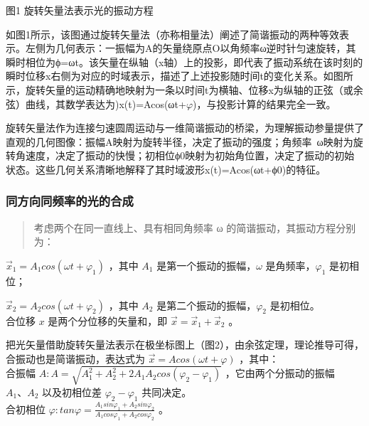 \documentclass[
]{article}
\begin{document}
图1 旋转矢量法表示光的振动方程

如图1所示，该图通过旋转矢量法（亦称相量法）阐述了简谐振动的两种等效表示。左侧为几何表示：一振幅为A的矢量绕原点O以角频率ω逆时针匀速旋转，其瞬时相位为ϕ=ωt。该矢量在纵轴（x轴）上的投影，即代表了振动系统在该时刻的瞬时位移x右侧为对应的时域表示，描述了上述投影随时间t的变化关系。如图所示，旋转矢量的运动精确地映射为一条以时间t为横轴、位移x为纵轴的正弦（或余弦）曲线，其数学表达为)x(t)=Acos(ωt+\(\varphi\))，与投影计算的结果完全一致。

旋转矢量法作为连接匀速圆周运动与一维简谐振动的桥梁，为理解振动参量提供了直观的几何图像：振幅A映射为旋转半径，决定了振动的强度；角频率~ω映射为旋转角速度，决定了振动的快慢；初相位ϕ0\hspace{0pt}映射为初始角位置，决定了振动的初始状态。这些几何关系清晰地解释了其时域波形x(t)=Acos(ωt+ϕ0)的特征。

\hypertarget{ux540cux65b9ux5411ux540cux9891ux7387ux7684ux5149ux7684ux5408ux6210}{%
\subsubsection{同方向同频率的光的合成}\label{ux540cux65b9ux5411ux540cux9891ux7387ux7684ux5149ux7684ux5408ux6210}}

\begin{quote}
考虑两个在同一直线上、具有相同角频率 ω 的简谐振动，其振动方程分别为：
\end{quote}

\({\overrightarrow{x}}_{1} = A_{1}cos\left( \omega t + \varphi_{1} \right)\)
，其中 \(A_{1}\) 是第一个振动的振幅，\(\omega\)
是角频率，\(\varphi_{1}\) 是初相位；

\({\overrightarrow{x}}_{2} = A_{2}cos\left( \omega t + \varphi_{2} \right)\)
，其中 \(A_{2}\) 是第二个振动的振幅，\(\varphi_{2}\) 是初相位。\\
合位移 \(x\) 是两个分位移的矢量和，即
\(\overrightarrow{x} = {\overrightarrow{x}}_{1} + {\overrightarrow{x}}_{2}\)
。

把光矢量借助旋转矢量法表示在极坐标图上（图2），由余弦定理，理论推导可得，合振动也是简谐振动，表达式为
\(\overrightarrow{x} = Acos(\omega t + \varphi)\) ，其中：\\
合振幅
\(A:A = \sqrt{A_{1}^{2} + A_{2}^{2} + 2A_{1}A_{2}cos\left( \varphi_{2} - \varphi_{1} \right)}\)
，它由两个分振动的振幅 \(A_{1}、A_{2}\) 以及初相位差
\(\varphi_{2} - \varphi_{1}\) 共同决定。\\
合初相位
\(\varphi:tan\varphi = \frac{A_{1}sin\varphi_{1} + A_{2}sin\varphi_{2}}{A_{1}cos\varphi_{1} + A_{2}cos\varphi_{2}}\)
。
\end{document}
